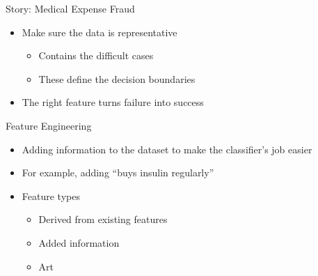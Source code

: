 \documentclass{beamer}
\begin{document}
\begin{frame}{Story: Medical Expense Fraud}

\vspace{-2cm}

  \begin{center}
  \end{center}
  
\pause

\vspace{-7cm}

\begin{itemize}
\item Make sure the data is representative
  \begin{itemize}
    \item Contains the \alert{difficult} cases
    \item These define the \alert{decision boundaries} \pause
  \end{itemize}
\item The right feature turns failure into success
\end{itemize}

\end{frame}

\begin{frame}{Feature Engineering}
  \begin{itemize}
  \item Adding information to the dataset to make the classifier's job easier
  \item For example, adding ``buys insulin regularly''
  \item Feature types
    \begin{itemize}
      \item Derived from existing features
      \item Added information
      \item Art
    \end{itemize}
  \end{itemize}
\end{frame}

\end{document}
